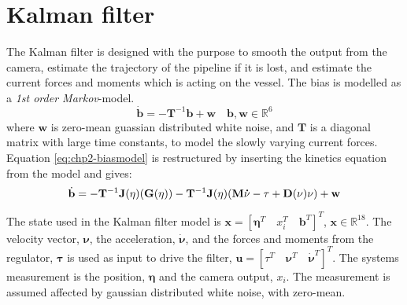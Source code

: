 \section{Kalman filter}
	The Kalman filter is designed with the purpose to smooth the output from the camera, estimate the trajectory of the pipeline if it is lost, and estimate the current forces and moments which is acting on the vessel. The bias is modelled as a \textit{1st order Markov}-model.
	\begin{equation}
		\label{eq:chp2-biasmodel}
		\dot{\mathbf{b}} = -\mathbf{T}^{-1} \mathbf{b} + \mathbf{w} \quad \mathbf{b}, \mathbf{w} \in \mathbb{R}^6
	\end{equation}
	where $\mathbf{w}$ is zero-mean guassian distributed white noise, and $\mathbf{T}$ is a diagonal matrix with large time constants, to model the slowly varying current forces. 
	Equation \eqref{eq:chp2-biasmodel} is restructured by inserting the kinetics equation from the model and gives:
	\begin{equation}
		\dot{\mathbf{b}} = -\mathbf{T}^{-1} \mathbf{J}(\mathbf{\eta}) (\mathbf{G}(\mathbf{\eta})) - \mathbf{T}^{-1} \mathbf{J}(\mathbf{\eta}) (\mathbf{M}\mathbf{\dot{\nu}} - \tau + \mathbf{D}(\mathbf{\nu})\mathbf{\nu}) + \mathbf{w}
	\end{equation}

	
	The state used in the Kalman filter model is $\mathbf{x} = [\mathbf{\eta}^T \quad x_i^T \quad \mathbf{b}^T]^T$, $\mathbf{x} \in \mathbb{R}^{18}$. The velocity vector, $\mathbf{\nu}$, the acceleration, $\dot{\mathbf{\nu}}$, and the forces and moments from the regulator, $\mathbf{\tau}$ is used as input to drive the filter, $\mathbf{u} = [\tau^T \quad \mathbf{\nu}^T \quad \mathbf{\dot{\nu}}^T]^T$. The systems measurement is the position, $\mathbf{\eta}$ and the camera output, $x_i$. The measurement is assumed affected by gaussian distributed white noise, with zero-mean.
	
